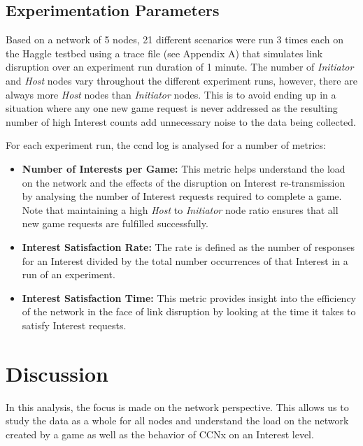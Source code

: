 \documentclass[a4paper,12pt]{report}      %
\begin{document}
\subsection{Experimentation Parameters} 

Based on a network of 5 nodes, 21 different scenarios were run 3 times each on the Haggle testbed
using a trace file (see Appendix A) that simulates link disruption over an experiment run duration of 1 minute. The
number of \emph{Initiator} and \emph{Host} nodes vary throughout the different experiment runs, however, there are always
more \emph{Host} nodes than \emph{Initiator} nodes. This is to avoid ending up in a situation where any one new game
request is never addressed as the resulting number of high Interest counts add unnecessary noise to the
data being collected.


\noindent For each experiment run, the ccnd log is analysed for a number of metrics:

\begin{itemize}
\item \textbf{Number of Interests per Game:} This metric helps understand the load on the network and the
effects of the disruption on Interest re-transmission by analysing the number of Interest requests
required to complete a game. Note that maintaining a high \emph{Host} to \emph{Initiator} node ratio ensures
that all new game requests are fulfilled successfully.

\item \textbf{Interest Satisfaction Rate:} The rate is defined as the number of responses for an Interest divided
 by the total number occurrences of that Interest in a run of an experiment.

\item \textbf{Interest Satisfaction Time:} This metric provides insight into the efficiency of the network in the
face of link disruption by looking at the time it takes to satisfy Interest requests.
\end{itemize}

\section{Discussion}

In this analysis, the focus is made on the network perspective. This allows us to study the data as a
whole for all nodes and understand the load on the network created by a game as well as the behavior
of CCNx on an Interest level.
\end{document}

